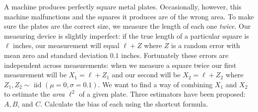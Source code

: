 \documentclass[addpoints,12pt]{exam}
\begin{document}
\begin{questions}

\question A machine produces perfectly square metal plates. 
Occasionally, however, this machine malfunctions and the squares it produces are of the wrong area.
To make sure the plates are the correct size, we measure the length of each one \emph{twice}.
Our measuring device is slightly imperfect: if the true length of a particular square is $\ell$ inches, our measurement will equal $\ell + Z$ where $Z$ is a random error with mean zero and standard deviation $0.1$ inches.   
Fortunately these errors are independent across measurements: when we measure a square twice our first measurement will be $X_1 = \ell + Z_1$ and our second will be $X_2 = \ell + Z_2$ where $Z_1, Z_2 \sim \mbox{ iid } (\mu = 0, \sigma = 0.1)$.
We want to find a way of combining $X_1$ and $X_2$ to estimate the \emph{area} $\ell^2$ of a given plate.
Three estimators have been proposed: $A, B$, and $C$.
Calculate the bias of each using the shortcut formula.
\begin{parts}

\end{parts}
\end{questions}
\end{document}
